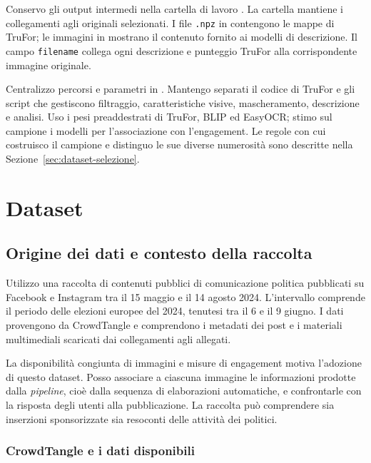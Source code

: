 Conservo gli output intermedi nella cartella di lavoro . La cartella  mantiene i collegamenti agli originali selezionati. I file \texttt{.npz} in  contengono le mappe di TruFor; le immagini in  mostrano il contenuto fornito ai modelli di descrizione. Il campo \texttt{filename} collega ogni descrizione e punteggio TruFor alla corrispondente immagine originale.

Centralizzo percorsi e parametri in . Mantengo separati il codice di TruFor e gli script che gestiscono filtraggio, caratteristiche visive, mascheramento, descrizione e analisi. Uso i pesi preaddestrati di TruFor, BLIP ed EasyOCR; stimo sul campione i modelli per l'associazione con l'engagement. Le regole con cui costruisco il campione e distinguo le sue diverse numerosità sono descritte nella Sezione~\ref{sec:dataset-selezione}.

\section{Dataset}
\label{sec:materiali-dataset}

\subsection{Origine dei dati e contesto della raccolta}
\label{subsec:dataset-origine}

Utilizzo una raccolta di contenuti pubblici di comunicazione politica pubblicati su Facebook e Instagram tra il 15 maggio e il 14 agosto 2024. L'intervallo comprende il periodo delle elezioni europee del 2024, tenutesi tra il 6 e il 9 giugno. I dati provengono da CrowdTangle e comprendono i metadati dei post e i materiali multimediali scaricati dai collegamenti agli allegati.

La disponibilità congiunta di immagini e misure di engagement motiva l'adozione di questo dataset. Posso associare a ciascuna immagine le informazioni prodotte dalla \emph{pipeline}, cioè dalla sequenza di elaborazioni automatiche, e confrontarle con la risposta degli utenti alla pubblicazione. La raccolta può comprendere sia inserzioni sponsorizzate sia resoconti delle attività dei politici.

\subsubsection{CrowdTangle e i dati disponibili}
\label{subsubsec:dataset-crowdtangle}


